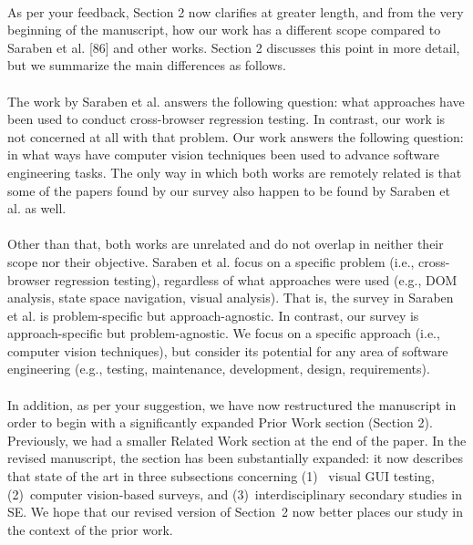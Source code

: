 \documentclass[12pt]{article}
\newcommand\response[1]{\textcolor{responseColor}{\\#1\\}}
\begin{document}
\response{
	As per your feedback, Section 2 now 
	clarifies at greater length, and from the 
	very beginning of the manuscript, how our work has 
	a different scope compared to Saraben et al. [86] 
	and other works. Section 2 
	discusses this point in more detail, but we 
	summarize the main differences as follows. 
	\\ \\
	The work by Saraben et al. answers the following
	question: what approaches have been used to 
	conduct cross-browser regression testing.
	In contrast, our work is not concerned at all with 
	that problem. 
	Our work answers the following question: in what 
	ways have computer 
	vision techniques been used to advance software engineering tasks. 
	The only way in which both works are remotely 
	related is that some of the papers found by our 
	survey also happen to be found by Saraben et al. 
	as well.
	\\ \\
	Other than that, both works are unrelated and do not 
	overlap in neither their scope nor their objective. 
	Saraben et al. focus on a specific 
	problem (i.e., cross-browser regression testing), 
	regardless of what approaches were used (e.g., DOM 
	analysis, state space navigation, visual analysis). 
	That is, the survey in Saraben et al. is 
	problem-specific but approach-agnostic. 
	In contrast, our survey is approach-specific but 
	problem-agnostic. We focus on a specific approach 
	(i.e., computer vision techniques), but consider its 
	potential for any area of software engineering 
	(e.g., testing, maintenance, development, design, 
	requirements). 
	\\ \\
	In addition, as per your suggestion, we have 
	now restructured the manuscript 
	in order to begin with a significantly expanded 
	Prior Work section (Section 2). 
	Previously, we had a smaller Related Work section at 
	the end of the paper.
	In the revised manuscript, the section has been 
	substantially expanded: it now describes that state 
	of the art in three subsections concerning (1)
	~visual GUI testing, (2)~computer vision-based 
	surveys, and (3)~interdisciplinary secondary studies 
	in SE. We hope that our revised version of 
	Section~2 now better places our study in the context 
	of the prior work.
}
\end{document}
